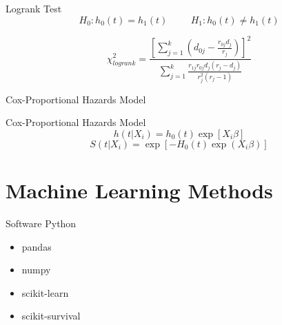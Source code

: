 \documentclass{beamer}
\begin{document}
\begin{frame}{Logrank Test}
\begin{equation*}
    H_0: h_0(t) = h_1(t) \hspace{1cm} H_1: h_0(t) \neq h_1(t)
\end{equation*}

\begin{equation*}
    \chi^2_{logrank} = \frac{\left[\sum^k_{j=1}\left(d_{0j}-\frac{r_{0j}d_j}{r_j}\right)\right]^2}{\sum^k_{j=1}\frac{r_{1j}r_{0j}d_j(r_j-d_j)}{r^2_j(r_j-1)}}
\end{equation*}

\cite{FlemingHarrington}
\end{frame}

\begin{frame}{Cox-Proportional Hazards Model}
    \begin{block}{Cox-Proportional Hazards Model}
        \begin{equation*}
            h(t|X_i) = h_0(t) \exp[X_i\beta]
        \end{equation*}
        \begin{equation*}
        S(t|X_i) = \exp[-H_0(t) \exp(X_i\beta)]
    \end{equation*}
    \end{block}
\end{frame}


\section{Machine Learning Methods}
\begin{frame}{Software}
Python
\begin{itemize}
\item pandas
\item numpy
\item scikit-learn
\item scikit-survival
\end{itemize}

\end{frame}
\end{document}
